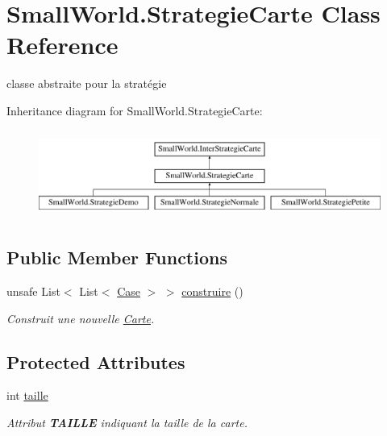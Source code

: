 \hypertarget{class_small_world_1_1_strategie_carte}{\section{Small\-World.\-Strategie\-Carte Class Reference}
\label{class_small_world_1_1_strategie_carte}
}


classe abstraite pour la stratégie  


Inheritance diagram for Small\-World.\-Strategie\-Carte\-:\begin{figure}[H]
\begin{center}
\leavevmode
\includegraphics[height=2.901554cm]{class_small_world_1_1_strategie_carte}
\end{center}
\end{figure}
\subsection*{Public Member Functions}
\begin{DoxyCompactItemize}
\item 
\hypertarget{class_small_world_1_1_strategie_carte_aafe89809c98196f4b1d48436d02bcbed}{unsafe List$<$ List$<$ \hyperlink{class_small_world_1_1_case}{Case} $>$ $>$ \hyperlink{class_small_world_1_1_strategie_carte_aafe89809c98196f4b1d48436d02bcbed}{construire} ()}\label{class_small_world_1_1_strategie_carte_aafe89809c98196f4b1d48436d02bcbed}

\begin{DoxyCompactList}\small\item\em Construit une nouvelle \hyperlink{class_small_world_1_1_carte}{Carte}. \end{DoxyCompactList}\end{DoxyCompactItemize}
\subsection*{Protected Attributes}
\begin{DoxyCompactItemize}
\item 
\hypertarget{class_small_world_1_1_strategie_carte_a04a14a2cc7b170caec54ff2d87f70724}{int \hyperlink{class_small_world_1_1_strategie_carte_a04a14a2cc7b170caec54ff2d87f70724}{taille}}\label{class_small_world_1_1_strategie_carte_a04a14a2cc7b170caec54ff2d87f70724}

\begin{DoxyCompactList}\small\item\em Attribut {\bfseries T\-A\-I\-L\-L\-E} indiquant la taille de la carte. \end{DoxyCompactList}\end{DoxyCompactItemize}
